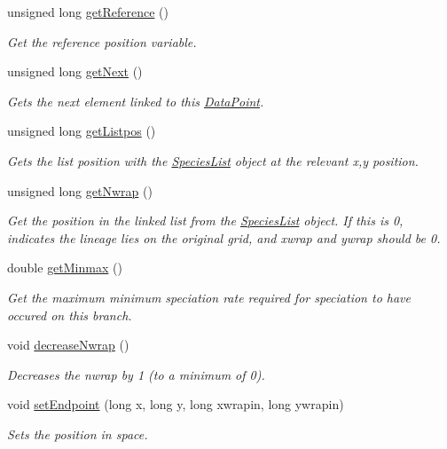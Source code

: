 \begin{DoxyCompactItemize}
unsigned long \hyperlink{class_data_point_aa8b811037d67e2c74c16e9d85939969e}{get\+Reference} ()
\begin{DoxyCompactList}\small\item\em Get the reference position variable. \end{DoxyCompactList}\item 
unsigned long \hyperlink{class_data_point_a77bfe024c349550b8f0812cca41c8649}{get\+Next} ()
\begin{DoxyCompactList}\small\item\em Gets the next element linked to this \hyperlink{class_data_point}{Data\+Point}. \end{DoxyCompactList}\item 
unsigned long \hyperlink{class_data_point_a8c60a34fba35ffb915a57f0968043798}{get\+Listpos} ()
\begin{DoxyCompactList}\small\item\em Gets the list position with the \hyperlink{class_species_list}{Species\+List} object at the relevant x,y position. \end{DoxyCompactList}\item 
unsigned long \hyperlink{class_data_point_a874d55e25ca0809ba5b8d5d5256731e5}{get\+Nwrap} ()
\begin{DoxyCompactList}\small\item\em Get the position in the linked list from the \hyperlink{class_species_list}{Species\+List} object. If this is 0, indicates the lineage lies on the original grid, and xwrap and ywrap should be 0. \end{DoxyCompactList}\item 
double \hyperlink{class_data_point_a190823c53c821336c7a40d1aee6a5995}{get\+Minmax} ()
\begin{DoxyCompactList}\small\item\em Get the maximum minimum speciation rate required for speciation to have occured on this branch. \end{DoxyCompactList}\item 
void \hyperlink{class_data_point_a2d939bcbc5abae0d80fdd42a1b26725f}{decrease\+Nwrap} ()\hypertarget{class_data_point_a2d939bcbc5abae0d80fdd42a1b26725f}{}\label{class_data_point_a2d939bcbc5abae0d80fdd42a1b26725f}

\begin{DoxyCompactList}\small\item\em Decreases the nwrap by 1 (to a minimum of 0). \end{DoxyCompactList}\item 
void \hyperlink{class_data_point_a1d80702ad55b2c64f386b71052adc4d8}{set\+Endpoint} (long x, long y, long xwrapin, long ywrapin)
\begin{DoxyCompactList}\small\item\em Sets the position in space. \end{DoxyCompactList}\end{DoxyCompactItemize}
